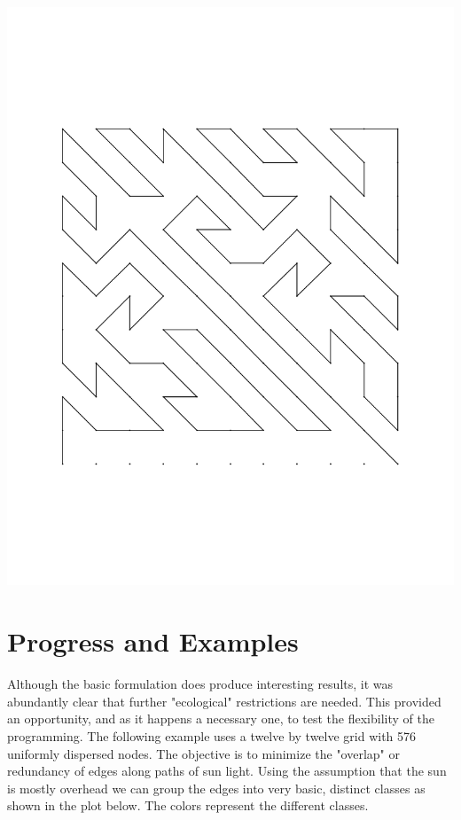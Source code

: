 \documentclass[letterpaper,11pt]{texMemo} %
\begin{document}
\begin{center}
\includegraphics[scale=0.35]{OptimalLimitless111EdgesUsed.pdf}
\end{center}

\section{Progress and Examples}

Although the basic formulation does produce interesting results, it was abundantly clear that further "ecological" restrictions are needed. This provided an opportunity, and as it happens a necessary one, to test the flexibility of the programming. The following example uses a twelve by twelve grid with 576 uniformly dispersed nodes. The objective is to minimize the "overlap" or redundancy of edges along paths of sun light. Using the assumption that the sun is mostly overhead we can group the edges into very basic, distinct classes as shown in the plot below. The colors represent the different classes. 
\end{document}
